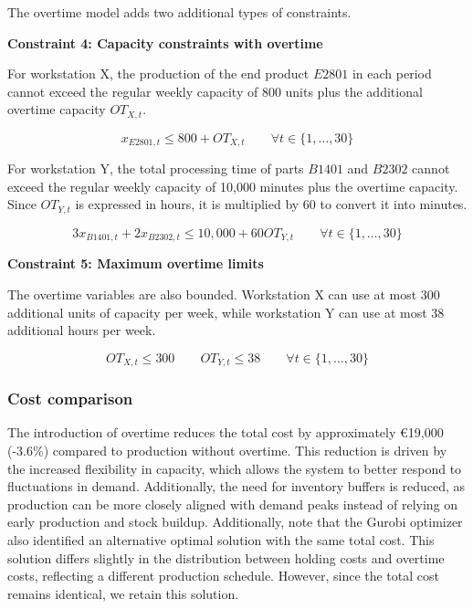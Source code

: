 \documentclass[a4paper,faculty=eb,language=en,doctype=article,sftitles=false]{ugent-doc}
\begin{document}
The overtime model adds two additional types of constraints.

\vspace{0.3em}
\textbf{Constraint 4: Capacity constraints with overtime}

For workstation X, the production of the end product \(E2801\) in each period cannot exceed the regular weekly capacity of 800 units plus the additional overtime capacity \(OT_{X,t}\).

\[
x_{E2801,t} \leq 800 + OT_{X,t}
\qquad
\forall t \in \{1,\ldots,30\}
\]

For workstation Y, the total processing time of parts \(B1401\) and \(B2302\) cannot exceed the regular weekly capacity of 10{,}000 minutes plus the overtime capacity. Since \(OT_{Y,t}\) is expressed in hours, it is multiplied by 60 to convert it into minutes.

\[
3x_{B1401,t} + 2x_{B2302,t}
\leq 10{,}000 + 60OT_{Y,t}
\qquad
\forall t \in \{1,\ldots,30\}
\]

\textbf{Constraint 5: Maximum overtime limits}

The overtime variables are also bounded. Workstation X can use at most 300 additional units of capacity per week, while workstation Y can use at most 38 additional hours per week.

\[
OT_{X,t} \leq 300 \qquad OT_{Y,t} \leq 38 \qquad \forall t \in \{1,\ldots,30\}
\]

\subsubsection{Cost comparison}

The introduction of overtime reduces the total cost by approximately €19{,}000 (-3.6\%) compared to production without overtime. This reduction is driven by the increased flexibility in capacity, which allows the system to better respond to fluctuations in demand. Additionally, the need for inventory buffers is reduced, as production can be more closely aligned with demand peaks instead of relying on early production and stock buildup.
Additionally, note that the Gurobi optimizer also identified an alternative optimal solution with the same total cost. This solution differs slightly in the distribution between holding costs and overtime costs, reflecting a different production schedule. However, since the total cost remains identical, we retain this solution.
\end{document}
